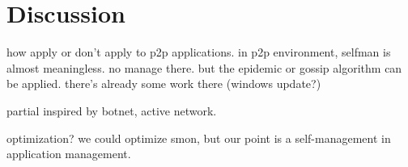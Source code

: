\section{Discussion}
\label{sec:discuss}

how apply or don't apply to p2p applications. in p2p
environment, selfman is almost meaningless. no manage there. but
the epidemic or gossip algorithm can be applied. there's already
some work there (windows update?)

partial inspired by botnet, active network.

optimization? we could optimize smon, but our point is a
self-management in application management.

